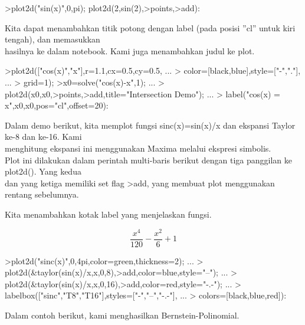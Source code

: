 \documentclass[a4paper,10pt]{article}
\begin{document}
\begin{eulernotebook}
\begin{eulercomment}
\begin{eulercomment}
\begin{eulercomment}
\begin{eulercomment}
\begin{eulercomment}
\begin{eulercomment}
\begin{eulercomment}
\end{eulercomment}
\begin{eulerprompt}
>plot2d("sin(x)",0,pi); plot2d(2,sin(2),>points,>add):
\end{eulerprompt}
\begin{eulercomment}
Kita dapat menambahkan titik potong dengan label (pada posisi ”cl”
untuk kiri tengah), dan memasukkan\\
hasilnya ke dalam notebook. Kami juga menambahkan judul ke plot.
\end{eulercomment}
\begin{eulerprompt}
>plot2d(["cos(x)","x"],r=1.1,cx=0.5,cy=0.5, ...
>  color=[black,blue],style=["-","."], ...
>  grid=1);
>x0=solve("cos(x)-x",1);  ...
>  plot2d(x0,x0,>points,>add,title="Intersection Demo");  ...
>  label("cos(x) = x",x0,x0,pos="cl",offset=20):
\end{eulerprompt}
\begin{eulercomment}
Dalam demo berikut, kita memplot fungsi sinc(x)=sin(x)/x dan ekspansi
Taylor ke-8 dan ke-16. Kami\\
menghitung ekspansi ini menggunakan Maxima melalui ekspresi simbolis.\\
Plot ini dilakukan dalam perintah multi-baris berikut dengan tiga
panggilan ke plot2d(). Yang kedua\\
dan yang ketiga memiliki set flag \textgreater{}add, yang membuat plot menggunakan
rentang sebelumnya.

Kita menambahkan kotak label yang menjelaskan fungsi.
\end{eulercomment}
\begin{eulerformula}
\[
\frac{x^4}{120}-\frac{x^2}{6}+1
\]
\end{eulerformula}
\begin{eulerprompt}
>plot2d("sinc(x)",0,4pi,color=green,thickness=2); ...
>  plot2d(&taylor(sin(x)/x,x,0,8),>add,color=blue,style="--"); ...
>  plot2d(&taylor(sin(x)/x,x,0,16),>add,color=red,style="-.-"); ...
>  labelbox(["sinc","T8","T16"],styles=["-","--","-.-"], ...
>    colors=[black,blue,red]):
\end{eulerprompt}
\begin{eulercomment}
Dalam contoh berikut, kami menghasilkan Bernstein-Polinomial.


\end{eulercomment}
\end{eulercomment}
\end{eulercomment}
\end{eulercomment}
\end{eulercomment}
\end{eulercomment}
\end{eulercomment}
\end{eulernotebook}
\end{document}
